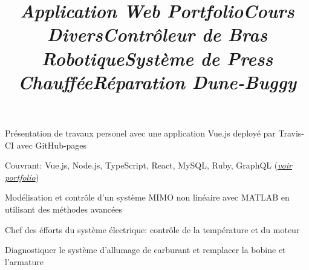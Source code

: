 \documentclass[mm]{res}
\begin{document}
\begin{resume}
\title{\textsl{Application Web Portfolio}}
\begin{position}
\tb Pr\'esentation de travaux personel avec une application Vue.js deploy\'e par Travis-CI avec GitHub-pages
\end{position}

\title{\textsl{Cours Divers}}
\begin{position}
\tb Couvrant: Vue.js, Node.js, TypeScript, React, MySQL, Ruby, GraphQL (\textsl{\href{\myport}{voir portfolio}})
\end{position}

\title{\textsl{Contr\^oleur de Bras Robotique}}
\begin{position}
\tb Mod\'elisation et contr\^ole d'un syst\`eme MIMO non lin\'eaire avec MATLAB en utilisant des m\'ethodes avanc\'ees
\end{position}

\title{\textsl{Syst\`eme de Press Chauff\'ee}}
\begin{position}
\tb Chef des \'efforts du syst\`eme \'electrique: contr\^ole de la temp\'erature et du moteur
\end{position}



\title{\textsl{R\'eparation Dune-Buggy}}
\begin{position}
\tb Diagnostiquer le syst\`eme d'allumage de carburant et remplacer la bobine et l'armature
\end{position}


\end{resume}
\end{document}
